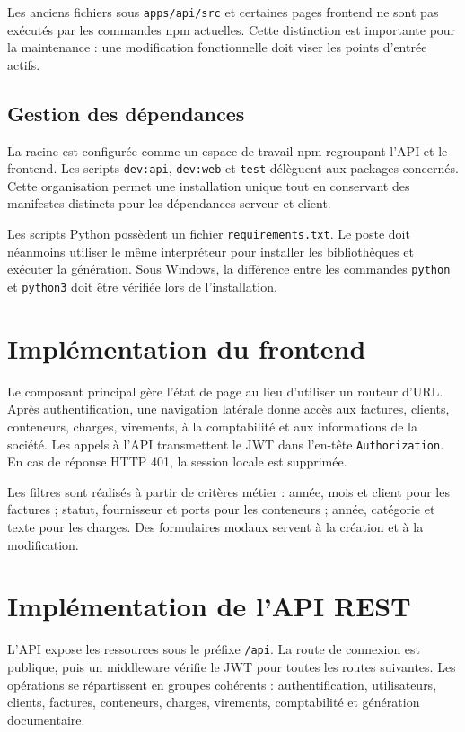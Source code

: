 \documentclass[12pt,a4paper,oneside]{report}
\newcommand{\code}[1]{\texttt{#1}}
\begin{document}
Les anciens fichiers sous \code{apps/api/src} et certaines pages frontend ne sont pas exécutés par les commandes npm actuelles. Cette distinction est importante pour la maintenance : une modification fonctionnelle doit viser les points d'entrée actifs.

\subsection{Gestion des dépendances}
La racine est configurée comme un espace de travail npm regroupant l'API et le frontend. Les scripts \code{dev:api}, \code{dev:web} et \code{test} délèguent aux packages concernés. Cette organisation permet une installation unique tout en conservant des manifestes distincts pour les dépendances serveur et client.

Les scripts Python possèdent un fichier \code{requirements.txt}. Le poste doit néanmoins utiliser le même interpréteur pour installer les bibliothèques et exécuter la génération. Sous Windows, la différence entre les commandes \code{python} et \code{python3} doit être vérifiée lors de l'installation.

\section{Implémentation du frontend}
Le composant principal gère l'état de page au lieu d'utiliser un routeur d'URL. Après authentification, une navigation latérale donne accès aux factures, clients, conteneurs, charges, virements, à la comptabilité et aux informations de la société. Les appels à l'API transmettent le JWT dans l'en-tête \code{Authorization}. En cas de réponse HTTP 401, la session locale est supprimée.

Les filtres sont réalisés à partir de critères métier : année, mois et client pour les factures ; statut, fournisseur et ports pour les conteneurs ; année, catégorie et texte pour les charges. Des formulaires modaux servent à la création et à la modification.

\section{Implémentation de l'API REST}
L'API expose les ressources sous le préfixe \code{/api}. La route de connexion est publique, puis un middleware vérifie le JWT pour toutes les routes suivantes. Les opérations se répartissent en groupes cohérents : authentification, utilisateurs, clients, factures, conteneurs, charges, virements, comptabilité et génération documentaire.
\end{document}
